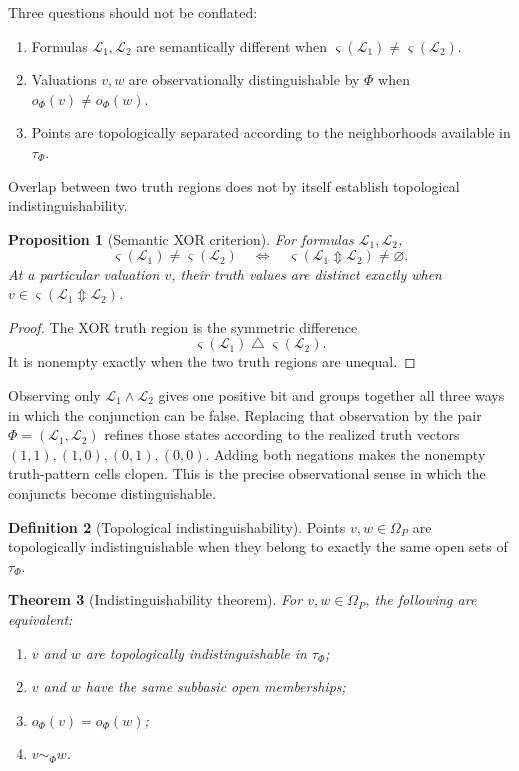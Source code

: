 \documentclass[11pt]{article}
\theoremstyle{definition}
\newtheorem{definition}{Definition}[section]
\theoremstyle{plain}
\newtheorem{theorem}[definition]{Theorem}
\newtheorem{proposition}[definition]{Proposition}
\theoremstyle{remark}
\begin{document}
Three questions should not be conflated:
\begin{enumerate}
\item Formulas $\mathcal L_1,\mathcal L_2$ are semantically different when
      $\varsigma(\mathcal L_1)\neq\varsigma(\mathcal L_2)$.
\item Valuations $v,w$ are observationally distinguishable by $\Phi$ when
      $o_\Phi(v)\neq o_\Phi(w)$.
\item Points are topologically separated according to the neighborhoods
      available in $\tau_\Phi$.
\end{enumerate}
Overlap between two truth regions does not by itself establish topological
indistinguishability.

\begin{proposition}[Semantic XOR criterion]
For formulas $\mathcal L_1,\mathcal L_2$,
\[
 \varsigma(\mathcal L_1)\neq\varsigma(\mathcal L_2)
 \quad\Longleftrightarrow\quad
 \varsigma(\mathcal L_1\Updownarrow\mathcal L_2)\neq\varnothing.
\]
At a particular valuation $v$, their truth values are distinct exactly when
$v\in\varsigma(\mathcal L_1\Updownarrow\mathcal L_2)$.
\end{proposition}

\begin{proof}
The XOR truth region is the symmetric difference
\[
 \varsigma(\mathcal L_1)\mathbin{\triangle}
 \varsigma(\mathcal L_2).
\]
It is nonempty exactly when the two truth regions are unequal.
\end{proof}

Observing only $\mathcal L_1\wedge\mathcal L_2$ gives one positive bit and
groups together all three ways in which the conjunction can be false.  Replacing
that observation by the pair $\Phi=(\mathcal L_1,\mathcal L_2)$ refines those
states according to the realized truth vectors $(1,1),(1,0),(0,1),(0,0)$.
Adding both negations makes the nonempty truth-pattern cells clopen.  This is
the precise observational sense in which the conjuncts become distinguishable.

\begin{definition}[Topological indistinguishability]
Points $v,w\in\Omega_P$ are topologically indistinguishable when they belong to
exactly the same open sets of $\tau_\Phi$.
\end{definition}

\begin{theorem}[Indistinguishability theorem]
For $v,w\in\Omega_P$, the following are equivalent:
\begin{enumerate}[label=(\roman*)]
\item $v$ and $w$ are topologically indistinguishable in $\tau_\Phi$;
\item $v$ and $w$ have the same subbasic open memberships;
\item $o_\Phi(v)=o_\Phi(w)$;
\item $v\sim_\Phi w$.
\end{enumerate}
\end{theorem}
\end{document}
